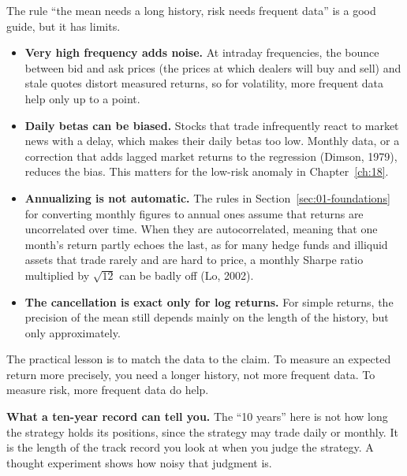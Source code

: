 \begin{technote}
The rule ``the mean needs a long history, risk needs frequent data'' is a good guide, but it has limits.
\begin{itemize}
  \item \textbf{Very high frequency adds noise.} At intraday frequencies, the bounce between bid and ask prices (the prices at which dealers will buy and sell) and stale quotes distort measured returns, so for volatility, more frequent data help only up to a point.
  \item \textbf{Daily betas can be biased.} Stocks that trade infrequently react to market news with a delay, which makes their daily betas too low. Monthly data, or a correction that adds lagged market returns to the regression (Dimson, 1979), reduces the bias. This matters for the low-risk anomaly in Chapter~\ref{ch:18}.
  \item \textbf{Annualizing is not automatic.} The rules in Section~\ref{sec:01-foundations} for converting monthly figures to annual ones assume that returns are uncorrelated over time. When they are autocorrelated, meaning that one month's return partly echoes the last, as for many hedge funds and illiquid assets that trade rarely and are hard to price, a monthly Sharpe ratio multiplied by $\sqrt{12}$ can be badly off (Lo, 2002).
  \item \textbf{The cancellation is exact only for log returns.} For simple returns, the precision of the mean still depends mainly on the length of the history, but only approximately.
\end{itemize}
\end{technote}

The practical lesson is to match the data to the claim. To measure an expected return more precisely, you need a longer history, not more frequent data. To measure risk, more frequent data do help.

\textbf{What a ten-year record can tell you.} The ``10 years'' here is not how long the strategy holds its positions, since the strategy may trade daily or monthly. It is the length of the track record you look at when you judge the strategy. A thought experiment shows how noisy that judgment is.

